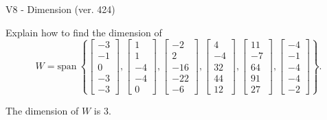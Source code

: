 \begin{exercise}
  \begin{exerciseTitle}V8 - Dimension (ver. 424)\end{exerciseTitle}
  \begin{exerciseStatement}
    Explain how to find the dimension of 
\[W=\mathrm{span}\ \left\{\left[\begin{array}{r}
-3 \\
-1 \\
0 \\
-3 \\
-3
\end{array}\right] , \left[\begin{array}{r}
1 \\
1 \\
-4 \\
-4 \\
0
\end{array}\right] , \left[\begin{array}{r}
-2 \\
2 \\
-16 \\
-22 \\
-6
\end{array}\right] , \left[\begin{array}{r}
4 \\
-4 \\
32 \\
44 \\
12
\end{array}\right] , \left[\begin{array}{r}
11 \\
-7 \\
64 \\
91 \\
27
\end{array}\right] , \left[\begin{array}{r}
-4 \\
-1 \\
-4 \\
-4 \\
-2
\end{array}\right]\right\}.\]



  \end{exerciseStatement}
  \begin{exerciseAnswer}
   The dimension of \(W\) is  \(3\).
  


  \end{exerciseAnswer}
\end{exercise}